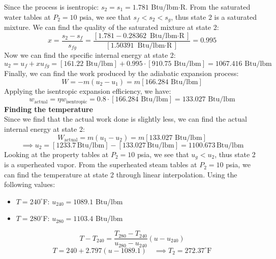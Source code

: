 \documentclass[12pt]{article}
\begin{document}
Since the process is isentropic: $s_2 = s_1 = 1.781$ Btu/lbm$\cdot$R. From the saturated water tables at $P_2 = 10$ psia, we see that $s_f<s_2<s_g$, thus state 2 is a saturated mixture. We can find the quality of the saturated mixture at state 2:
\[x = \frac{s_2 - s_f}{s_{fg}} = \frac{[1.781-0.28362\text{ Btu/lbm$\cdot$R} ]}{[1.50391\text{ Btu/lbm$\cdot$R}]}=0.995\]
Now we can find the specific internal energy at state 2:
\[u_2 = u_f + x u_{fg} = [161.22\text{ Btu/lbm}] + 0.995 \cdot [910.75\text{ Btu/lbm}] = 1067.416 \text{ Btu/lbm}\]
Finally, we can find the work produced by the adiabatic expansion process:
\[W = -m(u_2 - u_1) = m[166.284 \text{ Btu/lbm}]\]
Applying the isentropic expansion efficiency, we have:
\[w_\text{actual} = \eta w_\text{isentropic} = 0.8 \cdot [166.284 \text{ Btu/lbm}] = \boxed{133.027 \text{ Btu/lbm}}\]
\textbf{Finding the temperature}\\
Since we find that the actual work done is slightly less, we can find the actual internal energy at state 2:
\[W_\text{actual} = m(u_1 - u_2) = m[133.027 \text{ Btu/lbm}]\]
\[\implies u_2 = [1233.7\, \text{Btu/lbm}] - [133.027\, \text{Btu/lbm}] = 1100.673\, \text{Btu/lbm}\]
Looking at the property tables at $P_2 = 10$ psia, we see that $u_g<u_2$, thus state 2 is a superheated vapor. From the superheated steam tables at $P_2 = 10$ psia, we can find the temperature at state 2 through linear interpolation. Using the following values:
\begin{itemize}
    \item $T=240^\circ$F: $u_{240} = 1089.1$ Btu/lbm
    \item $T=280^\circ$F: $u_{280} = 1103.4$ Btu/lbm
\end{itemize}
\[T-T_{240} = \frac{T_{280}-T_{240}}{u_{280}-u_{240}}(u-u_{240})\]
\[T= 240 + 2.797(u-1089.1)\quad\implies T_2 = \boxed{272.37^\circ\text{F}}\]
\newpage
\end{document}
